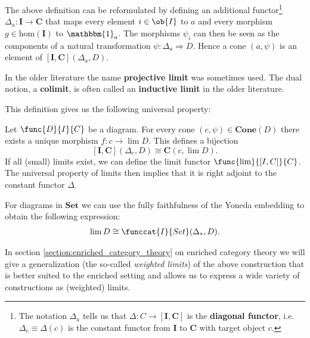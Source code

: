     \begin{adefinition}
        The above definition can be reformulated by defining an additional functor\footnote{The notation $\Delta_a$ tells us that $\Delta:C\rightarrow [\mathbf{I},\mathbf{C}]$ is the \textbf{diagonal functor}, i.e. $\Delta_c\equiv\Delta(c)$ is the constant functor from $\mathbf{I}$ to $\mathbf{C}$ with target object $c$.} $\Delta_a:\mathbf{I}\rightarrow\mathbf{C}$ that maps every element $i\in\ob{I}$ to $a$ and every morphism $g\in\text{hom}(\mathbf{I})$ to $\mathbbm{1}_a$. The morphisms $\psi_i$ can then be seen as the components of a natural transformation $\psi:\Delta_a\Rightarrow D$. Hence a cone $(a,\psi)$ is an element of $[\mathbf{I}, \mathbf{C}](\Delta_a, D)$.
    \end{adefinition}

    \begin{remark*}
        In the older literature the name \textbf{projective limit} was sometimes used. The dual notion, a \textbf{colimit}, is often called an \textbf{inductive limit} in the older literature.
    \end{remark*}
    This definition gives us the following universal property:
    \begin{uproperty}\label{cat:limit_uproperty}
        Let $\func{D}{I}{C}$ be a diagram. For every cone $(c,\psi)\in\mathbf{Cone}(D)$ there exists a unique morphism $f:c\rightarrow\lim D$. This defines a bijection \[[\mathbf{I}, \mathbf{C}](\Delta_c, D) \cong \mathbf{C}(c, \lim D).\]
        If all (small) limits exist, we can define the limit functor $\func{\lim}{[I, C]}{C}$. The universal property of limits then implies that it is right adjoint to the constant functor $\Delta$.

        For diagrams in $\mathbf{Set}$ we can use the fully faithfulness of the Yoneda embedding to obtain the following expression:
        \begin{gather}
            \lim D \cong \funccat{I}{Set}(\Delta_\ast, D).
        \end{gather}
    \end{uproperty}
    \begin{remark}
        In section \ref{section:enriched_category_theory} on enriched category theory we will give a generalization (the so-called \textit{weighted limits}) of the above construction that is better suited to the enriched setting and allows us to express a wide variety of constructions as (weighted) limits.
    \end{remark}

